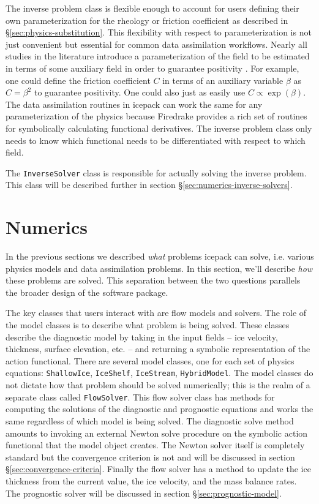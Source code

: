 \documentclass[journal abbreviation, manuscript]{copernicus}
\begin{document}
The inverse problem class is flexible enough to account for users defining their own parameterization for the rheology or friction coefficient as described in \S\ref{sec:physics-substitution}.
This flexibility with respect to parameterization is not just convenient but essential for common data assimilation workflows.
Nearly all studies in the literature introduce a parameterization of the field to be estimated in terms of some auxiliary field in order to guarantee positivity \citep{macayeal1992basal, joughin2009basal}.
For example, one could define the friction coefficient $C$ in terms of an auxiliary variable $\beta$ as $C = \beta^2$ to guarantee positivity.
One could also just as easily use $C \propto \exp(\beta)$.
The data assimilation routines in icepack can work the same for any parameterization of the physics because Firedrake provides a rich set of routines for symbolically calculating functional derivatives.
The inverse problem class only needs to know which functional needs to be differentiated with respect to which field.

The \texttt{InverseSolver} class is responsible for actually solving the inverse problem.
This class will be described further in section \S\ref{sec:numerics-inverse-solvers}.


\section{Numerics}

In the previous sections we described \emph{what} problems icepack can solve, i.e. various physics models and data assimilation problems.
In this section, we'll describe \emph{how} these problems are solved.
This separation between the two questions parallels the broader design of the software package.

The key classes that users interact with are flow models and solvers.
The role of the model classes is to describe what problem is being solved.
These classes describe the diagnostic model by taking in the input fields -- ice velocity, thickness, surface elevation, etc. -- and returning a symbolic representation of the action functional.
There are several model classes, one for each set of physics equations: \texttt{ShallowIce}, \texttt{IceShelf}, \texttt{IceStream}, \texttt{HybridModel}.
The model classes do not dictate how that problem should be solved numerically; this is the realm of a separate class called \texttt{FlowSolver}.
This flow solver class has methods for computing the solutions of the diagnostic and prognostic equations and works the same regardless of which model is being solved.
The diagnostic solve method amounts to invoking an external Newton solve procedure on the symbolic action functional that the model object creates.
The Newton solver itself is completely standard but the convergence criterion is not and will be discussed in section \S\ref{sec:convergence-criteria}.
Finally the flow solver has a method to update the ice thickness from the current value, the ice velocity, and the mass balance rates.
The prognostic solver will be discussed in section \S\ref{sec:prognostic-model}.
\end{document}
